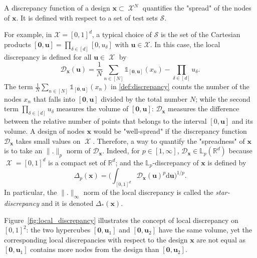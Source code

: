 \documentclass[twoside,11pt]{book}
\DeclareMathOperator{\X}{\mathcal{X}}
\begin{document}
 A discrepancy function of a design $\bm{x} \subset \X^{N}$ quantifies the "spread" of the nodes of $\bm{x}$. It is defined with respect to a set of test sets $\mathcal{S}$.





  For example, in $\mathcal{X} = [0,1]^{d}$, a typical choice of $\mathcal{S}$ is the set of the Cartesian products $[\bm{0},\bm{u}] = \prod\limits_{\delta \in [d]}[0,u_{\delta}]$ with $\bm{u} \in \mathcal{X}$. In this case, the local discrepancy is defined for all $\bm{u} \in \X$ by 
\begin{equation}\label{def:discrepancy}
\mathcal{D}_{\bm{x}}(\bm{u}) = \frac{1}{N}\sum\limits_{n \in [N]} \mathbb{1}_{[\bm{0},\bm{u}]}(x_{n}) - \prod\limits_{\delta \in [d]}u_{\delta}.
\end{equation}  
The term $\displaystyle \frac{1}{N}\sum\limits_{n \in [N]} \mathbb{1}_{[\bm{0},\bm{u}]}(x_{n})$ in \eqref{def:discrepancy} counts the number of the nodes $x_{n}$ that falls into $[\bm{0},\bm{u}]$ divided by the total number $N$; while the second term $\displaystyle  \prod\limits_{\delta \in [d]}u_{\delta}$ measures the volume of $[\bm{0},\bm{u}]$: $\mathcal{D}_{\bm{x}}$ measures the difference between the relative number of points that belongs to the interval $[0,\bm{u}]$ and its volume. A design of nodes $\bm{x}$ would be "well-spread" if the discrepancy function $\mathcal{D}_{\bm{x}}$ takes small values on $\X$. Therefore, a way to quantify the "spreadness" of $\bm{x}$ is to take an $\|.\|_{p}$ norm of $\mathcal{D}_{\bm{x}}$. Indeed, for $p \in [1,\infty]$, $\mathcal{D}_{\bm{x}} \in \mathbb{L}_{p}(\mathbb{R}^{d})$ because $\X = [0,1]^{d}$ is a compact set of $\mathbb{R}^{d}$; and the $\mathbb{L}_{p}$-discrepancy of $\bm{x}$ is defined by 
\begin{equation}
\Delta_{p}(\bm{x}) = \bigg(\int_{[0,1]^{d}}\mathcal{D}_{\bm{x}}(\bm{u})^{p} \mathrm{d}\bm{u}\bigg)^{1/p}.
\end{equation}
In particular, the $\|.\|_{\infty}$ norm of the local discrepancy is called the \emph{star-discrepancy} and it is denoted $\Delta_{*}(\bm{x})$.

Figure~\ref{fig:local_discrepancy} illustrates the concept of local discrepancy on $[0,1]^{2}$: the two hypercubes $[\bm{0},\bm{u}_{1}]$ and $[\bm{0},\bm{u}_{2}]$ have the same volume, yet the corresponding local discrepancies with respect to the design $\bm{x}$ are not equal as $[\bm{0},\bm{u}_{1}]$ contains more nodes from the design than $[\bm{0},\bm{u}_{2}]$.
\end{document}
